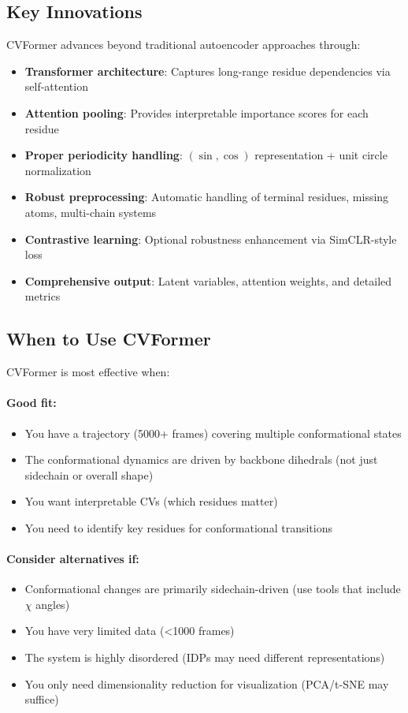 \documentclass[12pt,a4paper]{article}
\begin{document}
\subsection{Key Innovations}

CVFormer advances beyond traditional autoencoder approaches through:

\begin{itemize}
    \item \textbf{Transformer architecture}: Captures long-range residue dependencies via self-attention
    \item \textbf{Attention pooling}: Provides interpretable importance scores for each residue
    \item \textbf{Proper periodicity handling}: $(\sin, \cos)$ representation + unit circle normalization
    \item \textbf{Robust preprocessing}: Automatic handling of terminal residues, missing atoms, multi-chain systems
    \item \textbf{Contrastive learning}: Optional robustness enhancement via SimCLR-style loss
    \item \textbf{Comprehensive output}: Latent variables, attention weights, and detailed metrics
\end{itemize}

\subsection{When to Use CVFormer}

CVFormer is most effective when:

\paragraph{Good fit:}
\begin{itemize}
    \item You have a trajectory (5000+ frames) covering multiple conformational states
    \item The conformational dynamics are driven by backbone dihedrals (not just sidechain or overall shape)
    \item You want interpretable CVs (which residues matter)
    \item You need to identify key residues for conformational transitions
\end{itemize}

\paragraph{Consider alternatives if:}
\begin{itemize}
    \item Conformational changes are primarily sidechain-driven (use tools that include $\chi$ angles)
    \item You have very limited data (<1000 frames)
    \item The system is highly disordered (IDPs may need different representations)
    \item You only need dimensionality reduction for visualization (PCA/t-SNE may suffice)
\end{itemize}
\end{document}
